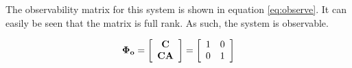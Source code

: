 The observability matrix for this system is shown in equation \ref{eq:observe}.
It can easily be seen that the matrix is full rank.
As such, the system is observable.

\begin{equation}
	\label{eq:observe}
	{\bf \Phi_o} = 
	 \left[
		\begin{array}{c}
			 {\bf C} \\
			 {\bf CA} \\
		\end{array}
	\right]
	=
	\left[
		\begin{array}{cc}
			1 & 0 \\
			0 & 1 \\
		\end{array}
	\right]
\end{equation}
